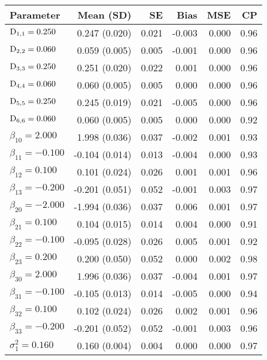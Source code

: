 \clearpage
\begin{table}[ht]
\centering
{}
\captionsetup{font=scriptsize}
\begingroup\tiny
\begin{tabular}{l|rrrrr}
  Parameter & Mean (SD) & SE & Bias & MSE & CP \\ 
  \hline
  $\mathrm{D}_{1,1} = 0.250$ &  0.247 (0.020) & 0.021 & -0.003 & 0.000 & 0.96 \\ 
  $\mathrm{D}_{2,2} = 0.060$ &  0.059 (0.005) & 0.005 & -0.001 & 0.000 & 0.96 \\ 
  $\mathrm{D}_{3,3} = 0.250$ &  0.251 (0.020) & 0.022 &  0.001 & 0.000 & 0.96 \\ 
  $\mathrm{D}_{4,4} = 0.060$ &  0.060 (0.005) & 0.005 &  0.000 & 0.000 & 0.96 \\ 
  $\mathrm{D}_{5,5} = 0.250$ &  0.245 (0.019) & 0.021 & -0.005 & 0.000 & 0.96 \\ 
  $\mathrm{D}_{6,6} = 0.060$ &  0.060 (0.005) & 0.005 &  0.000 & 0.000 & 0.92 \\ 
  $\beta_{10} = 2.000$ &  1.998 (0.036) & 0.037 & -0.002 & 0.001 & 0.93 \\ 
  $\beta_{11} = -0.100$ & -0.104 (0.014) & 0.013 & -0.004 & 0.000 & 0.93 \\ 
  $\beta_{12} = 0.100$ &  0.101 (0.024) & 0.026 &  0.001 & 0.001 & 0.96 \\ 
  $\beta_{13} = -0.200$ & -0.201 (0.051) & 0.052 & -0.001 & 0.003 & 0.97 \\ 
  $\beta_{20} = -2.000$ & -1.994 (0.036) & 0.037 &  0.006 & 0.001 & 0.97 \\ 
  $\beta_{21} = 0.100$ &  0.104 (0.015) & 0.014 &  0.004 & 0.000 & 0.91 \\ 
  $\beta_{22} = -0.100$ & -0.095 (0.028) & 0.026 &  0.005 & 0.001 & 0.92 \\ 
  $\beta_{23} = 0.200$ &  0.200 (0.050) & 0.052 &  0.000 & 0.002 & 0.98 \\ 
  $\beta_{30} = 2.000$ &  1.996 (0.036) & 0.037 & -0.004 & 0.001 & 0.97 \\ 
  $\beta_{31} = -0.100$ & -0.105 (0.013) & 0.014 & -0.005 & 0.000 & 0.94 \\ 
  $\beta_{32} = 0.100$ &  0.102 (0.024) & 0.026 &  0.002 & 0.001 & 0.96 \\ 
  $\beta_{33} = -0.200$ & -0.201 (0.052) & 0.052 & -0.001 & 0.003 & 0.96 \\ 
  $\sigma^2_1 = 0.160$ &  0.160 (0.004) & 0.004 &  0.000 & 0.000 & 0.97 \\ 

\end{tabular}
\end{table}
